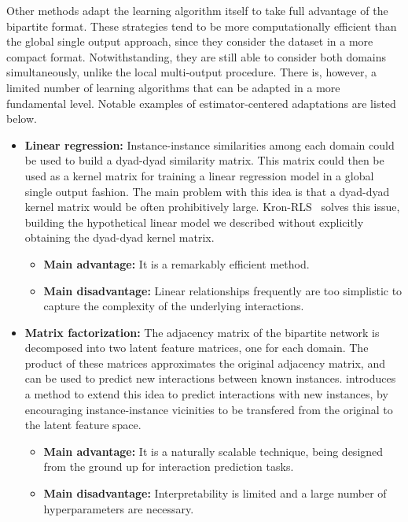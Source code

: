 Other methods adapt the learning algorithm itself to take full advantage of the bipartite format. These strategies tend to be more computationally efficient than the global single output approach, since they consider the dataset in a more compact format. Notwithstanding, they are still able to consider both domains simultaneously, unlike the local multi-output procedure. There is, however, a limited number of learning algorithms that can be adapted in a more fundamental level. Notable examples of estimator-centered adaptations are listed below.

\begin{itemize}
    \item \textbf{Linear regression:} Instance-instance similarities among each domain could be used to build a dyad-dyad similarity matrix. This matrix could then be used as a kernel matrix for training a linear regression model in a global single output fashion. The main problem with this idea is that a dyad-dyad kernel matrix would be often prohibitively large. Kron-RLS~\cite{vanlaarhoven2011gaussian} solves this issue, building the hypothetical linear model we described without explicitly obtaining the dyad-dyad kernel matrix.
    \begin{itemize}
        \item \textbf{Main advantage:} It is a remarkably efficient method.
        \item \textbf{Main disadvantage:} Linear relationships frequently are too simplistic to capture the complexity of the underlying interactions.
    \end{itemize}
    \item \textbf{Matrix factorization:} The adjacency matrix of the bipartite network is decomposed into two latent feature matrices, one for each domain. The product of these matrices approximates the original adjacency matrix, and can be used to predict new interactions between known instances. \textcite{liu2016neighborhood} introduces a method to extend this idea to predict interactions with new instances, by encouraging instance-instance vicinities to be transfered from the original to the latent feature space.
    \begin{itemize}
        \item \textbf{Main advantage:} It is a naturally scalable technique, being designed from the ground up for interaction prediction tasks.
        \item \textbf{Main disadvantage:} Interpretability is limited and a large number of hyperparameters are necessary.  %

\end{itemize}
\end{itemize}
